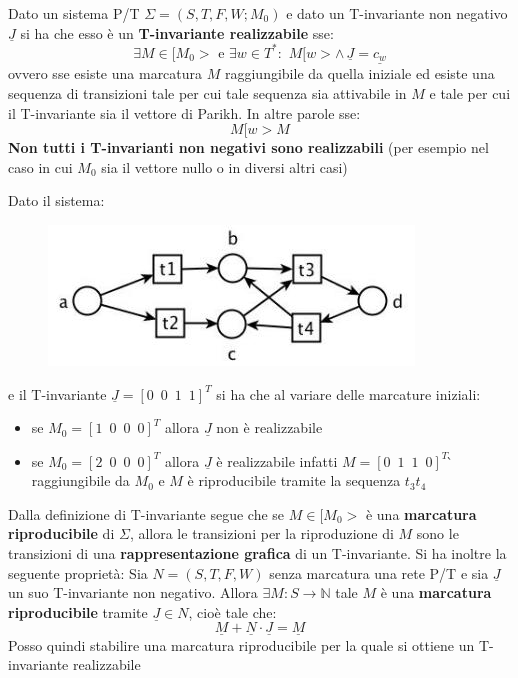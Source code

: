 \documentclass[a4paper,12pt, oneside]{book}
\begin{document}
\begin{definizione}
  Dato un sistema P/T $\Sigma=(S,T,F,W;M_0)$ e dato un T-invariante non negativo
  $\underline{J}$ si ha che esso è un \textbf{T-invariante realizzabile} sse:
  \[\exists M\in[M_0>\mbox{ e }\exists w\in T^*:\,\,M[w>\land\,
    \underline{J}=\underline{c_w}\]
  ovvero sse esiste una marcatura $M$ raggiungibile da quella iniziale ed esiste
  una sequenza di transizioni tale per cui tale sequenza sia attivabile in $M$
  e tale per cui il T-invariante sia il vettore di Parikh. In altre parole sse:
  \[M[w>M\]
  \textbf{Non tutti i T-invarianti non negativi sono realizzabili} (per esempio
  nel caso in cui $M_0$ sia il vettore nullo o in diversi altri casi)
  \begin{esempio}
    Dato il sistema:
    \begin{figure}[H]
      \centering
      \includegraphics[scale = 0.5]{img/ti5.jpg}
    \end{figure}
    e il T-invariante $\underline{J}=[0\,\,\,0\,\,\,1\,\,\,1]^T$
    si ha che al variare delle marcature iniziali:
    \begin{itemize}
      \item se $M_0=[1\,\,\,0\,\,\,0\,\,\,0]^T$ allora $\underline{J}$ non è
      realizzabile
      \item se $M_0=[2\,\,\,0\,\,\,0\,\,\,0]^T$ allora $\underline{J}$ è
      realizzabile infatti $M=[0\,\,\,1\,\,\,1\,\,\,0]^T$ ̀ raggiungibile da $M_0$
      e $M$ è riproducibile tramite la sequenza $t_3t_4$
    \end{itemize}
  \end{esempio}
\end{definizione}
\begin{definizione}
  Dalla definizione di T-invariante segue che se $M\in[M_0>$ è una
  \textbf{marcatura riproducibile} di $\Sigma$, allora le transizioni per la
  riproduzione di $M$ sono  le transizioni di una\textbf{ rappresentazione
    grafica} di un T-invariante.
  Si ha inoltre la seguente proprietà:
  Sia $N = (S, T , F , W )$ senza marcatura una rete P/T e sia $\underline{J}$
  un suo T-invariante non negativo. Allora $\exists M:S\to\mathbb{N}$ tale $M$ è
  una \textbf{marcatura riproducibile} tramite $\underline{J}\in N$, cioè tale
  che: 
  \[\underline{M}+\underline{N}\cdot \underline{J}=\underline{M}\]
  Posso quindi stabilire una marcatura riproducibile per la quale si ottiene un
  T-invariante realizzabile
\end{definizione}
\end{document}
